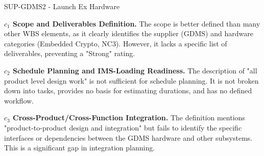 %
\begin{frame}{SUP-GDMS2 - Launch Ex Hardware}
\begin{minipage}{0.90\textwidth}
\raggedright
\fontsize{8}{9.5}\selectfont
\textbf{\(c_1\) Scope and Deliverables Definition.}
The scope is better defined than many other WBS elements, as it clearly identifies the supplier (GDMS) and hardware categories (Embedded Crypto, NC3). However, it lacks a specific list of deliverables, preventing a "Strong" rating.\par\vspace{0.6em}
\textbf{\(c_2\) Schedule Planning and IMS-Loading Readiness.}
The description of "all product level design work" is not sufficient for schedule planning. It is not broken down into tasks, provides no basis for estimating durations, and has no defined workflow.\par\vspace{0.6em}
\textbf{\(c_3\) Cross-Product/Cross-Function Integration.}
The definition mentions "product-to-product design and integration" but fails to identify the specific interfaces or dependencies between the GDMS hardware and other subsystems. This is a significant gap in integration planning.\par\vspace{0.6em}
\end{minipage}
\end{frame}

\endinput

